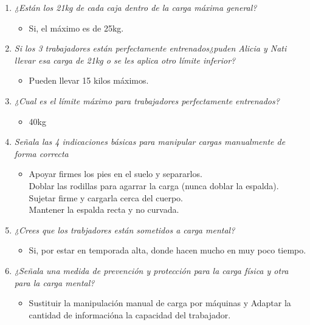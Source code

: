 \documentclass{article}
\begin{document}
        \begin{enumerate}[label=(\alph*)]
          \item \textit{¿Están los 21kg de cada caja dentro de la carga máxima general?}
            \begin{itemize}
              \item Si, el máximo es de 25kg.
            \end{itemize}
          \item \textit{Si los 3 trabajadores están perfectamente entrenados¿puden Alicia y Nati llevar esa carga de 21kg o se les aplica otro límite inferior?}
            \begin{itemize}
              \item Pueden llevar 15 kilos máximos.
            \end{itemize}
          \item \textit{¿Cual es el límite máximo para trabajadores perfectamente entrenados?}
            \begin{itemize}
              \item 40kg
            \end{itemize}
          \item \textit{Señala las 4 indicaciones básicas para manipular cargas manualmente de forma correcta}
            \begin{itemize}
              \item Apoyar firmes los pies en el suelo y separarlos. \\Doblar las rodillas para agarrar la carga (nunca doblar la espalda). \\Sujetar firme y cargarla cerca del cuerpo. \\Mantener la espalda recta y no curvada.
            \end{itemize}
          \item \textit{¿Crees que los trabjadores están sometidos a carga mental?}
            \begin{itemize}
              \item Si, por estar en temporada alta, donde hacen mucho en muy poco tiempo.
            \end{itemize}
          \item \textit{¿Señala una medida de prevención y protección para la carga física y otra para la carga mental?}
            \begin{itemize}
              \item Sustituir la manipulación manual de carga por máquinas y Adaptar la cantidad de informacióna la capacidad del trabajador.
            \end{itemize}
        \end{enumerate}
      
\end{document}
